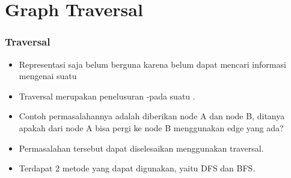 \section{Graph Traversal}
\frame{\sectionpage}

\begin{frame}
\frametitle{\fGraph Traversal}

\begin{itemize}
  \item Representasi \fGraph saja belum berguna karena belum dapat mencari informasi mengenai suatu \fgraph
  \item \alert{\fGraph Traversal} merupakan penelusuran \fnode-\fnode pada suatu \fgraph.
  \item Contoh permasalahannya adalah diberikan node A dan node B, ditanya apakah dari node A bisa pergi ke node B menggunakan edge yang ada?
  \item Permasalahan tersebut dapat diselesaikan menggunakan \fgraph traversal.
  \item Terdapat 2 metode yang dapat digunakan, yaitu DFS dan BFS.
\end{itemize}
\end{frame}

